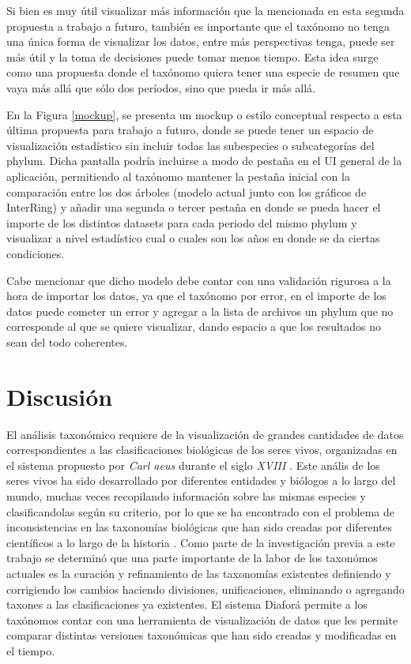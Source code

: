 \documentclass[journal]{IEEEtran}
\begin{document}
Si bien es muy útil visualizar más información que la mencionada en esta segunda propuesta a trabajo a futuro, también es importante que el taxónomo no tenga una única forma de visualizar los datos, entre más perspectivas tenga, puede ser más útil y la toma de decisiones puede tomar menos tiempo. Esta idea surge como una propuesta donde el taxónomo quiera tener una especie de resumen que vaya más allá que sólo dos períodos, sino que pueda ir más allá.

En la Figura \ref{mockup}, se presenta un mockup o estilo conceptual respecto a esta última propuesta para trabajo a futuro, donde se puede tener un espacio de visualización estadístico sin incluir todas las subespecies o subcategorías del phylum. Dicha pantalla podría incluirse a modo de pestaña en el UI general de la aplicación, permitiendo al taxónomo mantener la pestaña inicial con la comparación entre los dos árboles (modelo actual junto con los gráficos de InterRing) y añadir una segunda o tercer pestaña en donde se pueda hacer el importe de los distintos datasets para cada periodo del mismo phylum y visualizar a nivel estadístico cual o cuales son los años en donde se da ciertas condiciones.

Cabe mencionar que dicho modelo debe contar con una validación rigurosa a la hora de importar los datos, ya que el taxónomo por error, en el importe de los datos puede cometer un error y agregar a la lista de archivos un phylum que no corresponde al que se quiere visualizar, dando espacio a que los resultados no sean del todo coherentes.


\section {Discusión}
El análisis taxonómico requiere de la visualización de grandes cantidades de datos correspondientes a las clasificaciones biológicas de los seres vivos, organizadas en el sistema 
propuesto por \emph{Carl 
aeus} durante el siglo \emph{XVIII} \cite{linne}.
Este anális de los seres vivos  ha sido desarrollado por diferentes entidades y biólogos a lo largo del mundo, muchas veces recopilando información sobre las mismas especies
y clasificandolas según su criterio, por lo que se ha encontrado con el problema de inconsistencias en las taxonomías biológicas que han sido creadas por 
diferentes científicos a lo largo de la historia \cite{avise_liu_2011}.
Como parte de la investigación previa a este trabajo se determinó que una parte importante de la labor de los taxonómos actuales es la curación y refinamiento de las taxonomías existentes
definiendo y corrigiendo los cambios haciendo divisiones, unificaciones, eliminando o agregando taxones a las clasificaciones ya existentes.
El sistema Diaforá \cite{sancho_diafora} permite a los taxónomos contar con una herramienta  de visualización de datos que les permite comparar distintas versiones taxonómicas que han sido creadas y modificadas en el tiempo.
\end{document}
